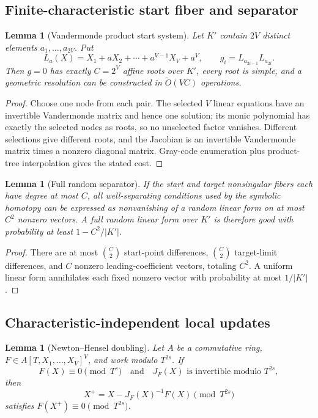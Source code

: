 \documentclass[10pt,a4paper]{article}
\newtheorem{lemma}[theorem]{Lemma}
\begin{document}
\subsection{Finite-characteristic start fiber and separator}

\begin{lemma}[Vandermonde product start system]\label{lem:vandermonde-start}
Let $K'$ contain $2V$ distinct elements $a_1,\ldots,a_{2V}$.  Put
\[
L_a(X)=X_1+aX_2+\cdots+a^{V-1}X_V+a^V,
\qquad
g_i=L_{a_{2i-1}}L_{a_{2i}}.
\]
Then $g=0$ has exactly $C=2^V$ affine roots over $K'$, every root is simple, and a geometric resolution can be constructed in $\widetilde O(VC)$ operations.
\end{lemma}

\begin{proof}
Choose one node from each pair.  The selected $V$ linear equations have an invertible Vandermonde matrix and hence one solution; its monic polynomial has exactly the selected nodes as roots, so no unselected factor vanishes.  Different selections give different roots, and the Jacobian is an invertible Vandermonde matrix times a nonzero diagonal matrix.  Gray-code enumeration plus product-tree interpolation gives the stated cost.
\end{proof}

\begin{lemma}[Full random separator]\label{lem:separator}
If the start and target nonsingular fibers each have degree at most $C$, all well-separating conditions used by the symbolic homotopy can be expressed as nonvanishing of a random linear form on at most $C^2$ nonzero vectors.  A full random linear form over $K'$ is therefore good with probability at least $1-C^2/|K'|$.
\end{lemma}

\begin{proof}
There are at most $\binom C2$ start-point differences, $\binom C2$ target-limit differences, and $C$ nonzero leading-coefficient vectors, totaling $C^2$.  A uniform linear form annihilates each fixed nonzero vector with probability at most $1/|K'|$.
\end{proof}

\subsection{Characteristic-independent local updates}

\begin{lemma}[Newton--Hensel doubling]\label{lem:newton-doubling}
Let $A$ be a commutative ring, $F\in A[T,X_1,\ldots,X_V]^V$, and work modulo $T^{2s}$.  If
\[
F(X)\equiv0\pmod{T^s}
\quad\text{and}\quad
J_F(X)\text{ is invertible modulo }T^{2s},
\]
then
\[
X^+=X-J_F(X)^{-1}F(X)\pmod{T^{2s}}
\]
satisfies $F(X^+)\equiv0\pmod{T^{2s}}$.
\end{lemma}
\end{document}
